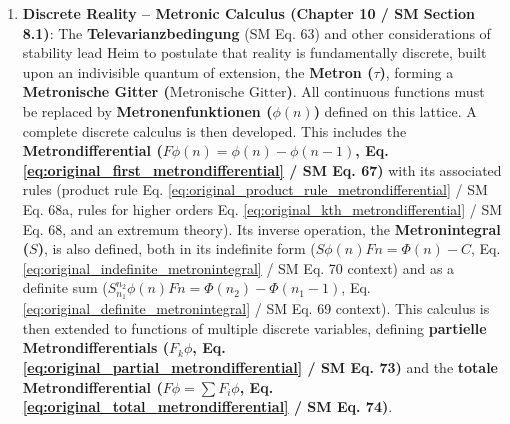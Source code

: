 \documentclass[12pt]{article}
\newcommand{\metron}{\tau}
\newcommand{\metronischegitter}{\text{Metronische Gitter}}
\newcommand{\metrondifferential}{F} %
\newcommand{\metronintegral}{S} %
\newcommand{\metronenfunktion}{\phi(n)}
\newcommand{\metronenziffer}{n}
\begin{document}
\begin{enumerate}
    \item \textbf{Discrete Reality – Metronic Calculus (Chapter 10 / SM Section 8.1)}: The \textbf{Televarianzbedingung} (SM Eq. 63) and other considerations of stability lead Heim to postulate that reality is fundamentally discrete, built upon an indivisible quantum of extension, the \textbf{Metron (\( \metron \))}, forming a \textbf{Metronische Gitter (\(\metronischegitter\))}. All continuous functions must be replaced by \textbf{Metronenfunktionen (\( \metronenfunktion \))} defined on this lattice. A complete discrete calculus is then developed. This includes the \textbf{Metrondifferential (\( \metrondifferential\phi(\metronenziffer) = \phi(\metronenziffer) - \phi(\metronenziffer-1) \), Eq. \eqref{eq:original_first_metrondifferential} / SM Eq. 67)} with its associated rules (product rule Eq. \eqref{eq:original_product_rule_metrondifferential} / SM Eq. 68a, rules for higher orders Eq. \eqref{eq:original_kth_metrondifferential} / SM Eq. 68, and an extremum theory). Its inverse operation, the \textbf{Metronintegral (\( \metronintegral \))}, is also defined, both in its indefinite form (\( \metronintegral\phi(\metronenziffer)\metrondifferential\metronenziffer = \Phi(\metronenziffer)-C \), Eq. \eqref{eq:original_indefinite_metronintegral} / SM Eq. 70 context) and as a definite sum (\( \metronintegral_{n_1}^{n_2}\phi(\metronenziffer)\metrondifferential\metronenziffer = \Phi(n_2)-\Phi(n_1-1) \), Eq. \eqref{eq:original_definite_metronintegral} / SM Eq. 69 context). This calculus is then extended to functions of multiple discrete variables, defining \textbf{partielle Metrondifferentials (\( F_k\phi \), Eq. \eqref{eq:original_partial_metrondifferential} / SM Eq. 73)} and the \textbf{totale Metrondifferential (\( F\phi = \sum F_i\phi \), Eq. \eqref{eq:original_total_metrondifferential} / SM Eq. 74)}.


\end{enumerate}
\end{document}
